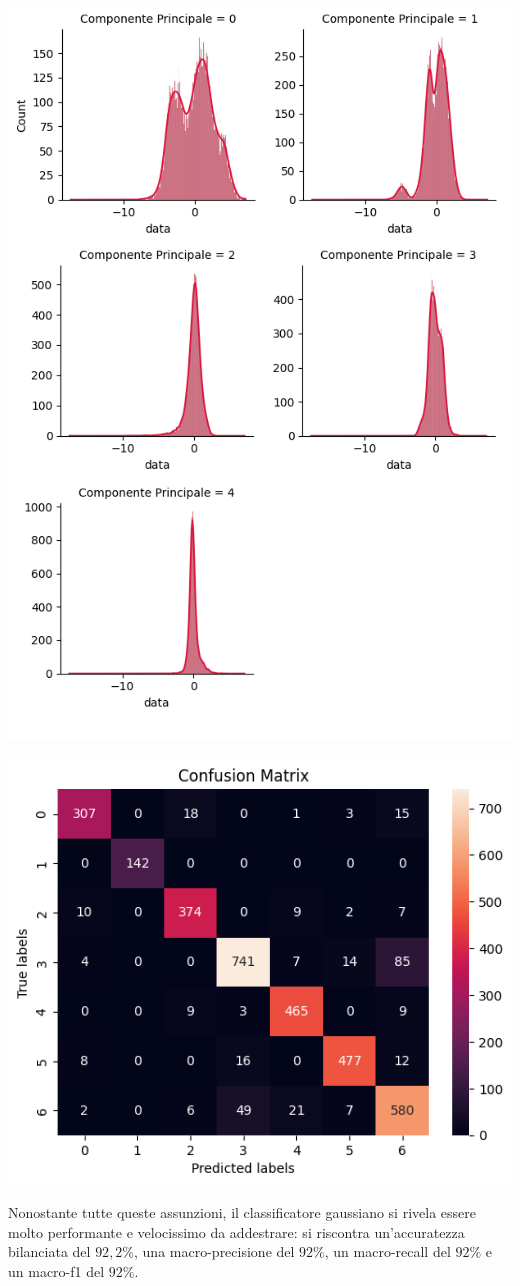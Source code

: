 \begin{Figure}
    \centering
    \includegraphics[width=0.85\linewidth]{img/components_distribution.png}
\end{Figure}

\begin{Figure}
    \centering
    \includegraphics[width=\linewidth]{img/gnb_confusion_matrix.png}
\end{Figure}

Nonostante tutte queste assunzioni, il classificatore gaussiano si rivela essere
molto performante e velocissimo da addestrare: si riscontra un'accuratezza 
bilanciata del $92,2\%$, una macro-precisione 
del $92\%$, un macro-recall del $92\%$ e un macro-f1 del $92\%$.
